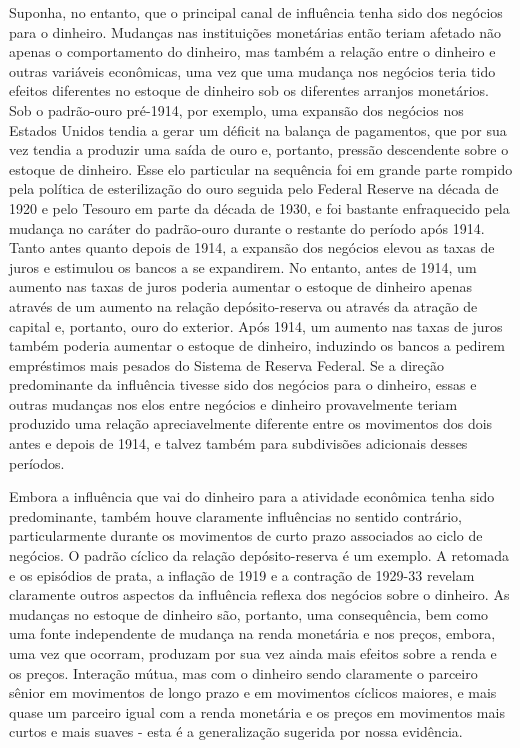 \documentclass[a4paper,12pt]{article}[abntex2]
\begin{document}
Suponha, no entanto, que o principal canal de influência tenha sido dos negócios para o dinheiro. Mudanças nas instituições monetárias então teriam afetado não apenas o comportamento do dinheiro, mas também a relação entre o dinheiro e outras variáveis econômicas, uma vez que uma mudança nos negócios teria tido efeitos diferentes no estoque de dinheiro sob os diferentes arranjos monetários. Sob o padrão-ouro pré-1914, por exemplo, uma expansão dos negócios nos Estados Unidos tendia a gerar um déficit na balança de pagamentos, que por sua vez tendia a produzir uma saída de ouro e, portanto, pressão descendente sobre o estoque de dinheiro. Esse elo particular na sequência foi em grande parte rompido pela política de esterilização do ouro seguida pelo Federal Reserve na década de 1920 e pelo Tesouro em parte da década de 1930, e foi bastante enfraquecido pela mudança no caráter do padrão-ouro durante o restante do período após 1914. Tanto antes quanto depois de 1914, a expansão dos negócios elevou as taxas de juros e estimulou os bancos a se expandirem. No entanto, antes de 1914, um aumento nas taxas de juros poderia aumentar o estoque de dinheiro apenas através de um aumento na relação depósito-reserva ou através da atração de capital e, portanto, ouro do exterior. Após 1914, um aumento nas taxas de juros também poderia aumentar o estoque de dinheiro, induzindo os bancos a pedirem empréstimos mais pesados do Sistema de Reserva Federal. Se a direção predominante da influência tivesse sido dos negócios para o dinheiro, essas e outras mudanças nos elos entre negócios e dinheiro provavelmente teriam produzido uma relação apreciavelmente diferente entre os movimentos dos dois antes e depois de 1914, e talvez também para subdivisões adicionais desses períodos.

Embora a influência que vai do dinheiro para a atividade econômica tenha sido predominante, também houve claramente influências no sentido contrário, particularmente durante os movimentos de curto prazo associados ao ciclo de negócios. O padrão cíclico da relação depósito-reserva é um exemplo. A retomada e os episódios de prata, a inflação de 1919 e a contração de 1929-33 revelam claramente outros aspectos da influência reflexa dos negócios sobre o dinheiro. As mudanças no estoque de dinheiro são, portanto, uma consequência, bem como uma fonte independente de mudança na renda monetária e nos preços, embora, uma vez que ocorram, produzam por sua vez ainda mais efeitos sobre a renda e os preços. Interação mútua, mas com o dinheiro sendo claramente o parceiro sênior em movimentos de longo prazo e em movimentos cíclicos maiores, e mais quase um parceiro igual com a renda monetária e os preços em movimentos mais curtos e mais suaves - esta é a generalização sugerida por nossa evidência.
\end{document}
